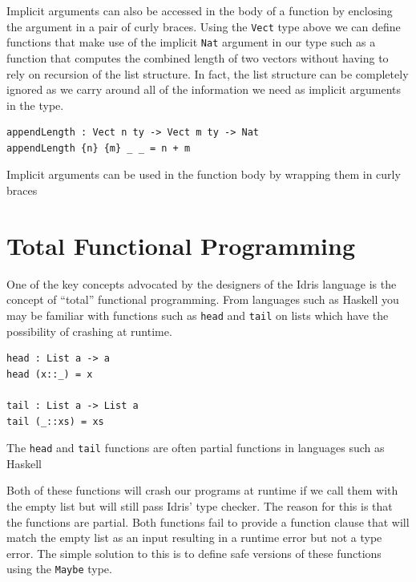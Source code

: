 \documentclass[a4paper, notitlepage]{report}
\begin{document}
Implicit arguments can also be accessed in the body of a function by enclosing
the argument in a pair of curly braces. Using the \texttt{Vect} type above we can define
functions that make use of the implicit \texttt{Nat} argument in our type such as a
function that computes the combined length of two vectors without having to rely
on recursion of the list structure. In fact, the list structure can be
completely ignored as we carry around all of the information we need as implicit
arguments in the type.

\begin{listing}[H]
\begin{verbatim}
appendLength : Vect n ty -> Vect m ty -> Nat
appendLength {n} {m} _ _ = n + m
\end{verbatim}
\caption{Implicit arguments can be used in the function body by wrapping them in curly braces}
\end{listing}

\section{Total Functional Programming}
\label{sec:orge435efc}
One of the key concepts advocated by the designers of the Idris language is the
concept of ``total'' functional programming. From languages such as Haskell you
may be familiar with functions such as \texttt{head} and \texttt{tail} on lists which have the
possibility of crashing at runtime.

\begin{listing}[H]
\begin{verbatim}
head : List a -> a
head (x::_) = x

tail : List a -> List a
tail (_::xs) = xs
\end{verbatim}
\caption{The \texttt{head} and \texttt{tail} functions are often partial functions in languages such as Haskell}
\end{listing}

Both of these functions will crash our programs at runtime if we call them with
the empty list but will still pass Idris' type checker. The reason for this is
that the functions are partial. Both functions fail to provide a function clause
that will match the empty list as an input resulting in a runtime error but not
a type error. The simple solution to this is to define safe versions of these
functions using the \texttt{Maybe} type.
\end{document}
